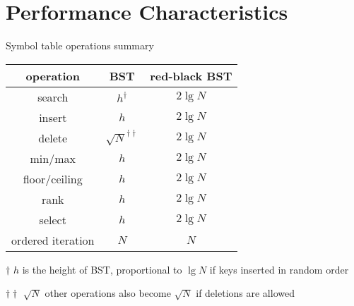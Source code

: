 \documentclass[8pt,a4paper,compress]{beamer}
\begin{document}
\section{Performance Characteristics}
\begin{frame}[fragile]
\pause

Symbol table operations summary

\begin{center}
\begin{tabular}{ccc}
operation & BST & red-black BST \\ \hline
search & $h^\dagger$ & $2\lg N$ \\
insert & $h$ & $2\lg N$ \\
delete & $\sqrt{N}^{\dagger\dagger}$ & $2\lg N$ \\
min/max & $h$ & $2\lg N$ \\
floor/ceiling & $h$ & $2\lg N$ \\
rank & $h$ & $2\lg N$ \\
select & $h$ & $2\lg N$ \\
ordered iteration & $N$ & $N$ 
\end{tabular}

\bigskip

\tiny $\dagger$ $h$ is the height of BST, proportional to $\lg N$ if keys inserted in random order

$\dagger\dagger$ $\sqrt{N}$ other operations also become $\sqrt{N}$ if deletions are allowed
\end{center} 
\end{frame}
\end{document}
